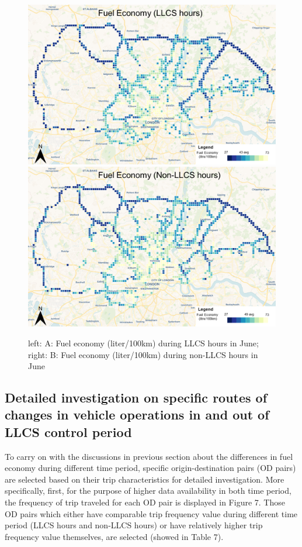 \documentclass[preprint,12pt,3p]{elsarticle}
\begin{document}
\begin{figure}[h]          
    \mbox{\includegraphics[scale=0.78]{llcsfuel.png}}   
    \hspace{0.1px}
    \mbox{\includegraphics[scale=0.78]{nonllcsfuel.png}}
    \caption{left: A: Fuel economy (liter/100km) during LLCS hours in June; right: B: Fuel economy (liter/100km) during non-LLCS hours in June}
    \label{fig6}
\end{figure}





\subsection{Detailed investigation on specific routes of changes in vehicle operations in and out of LLCS control period }

To carry on with the discussions in previous section about the differences in fuel economy during different time period, specific origin-destination pairs (OD pairs) are selected based on their trip characteristics for detailed investigation. More specifically, first, for the purpose of higher data availability in both time period, the frequency of trip traveled for each OD pair is displayed in Figure 7. Those OD pairs which either have comparable trip frequency value during different time period (LLCS hours and non-LLCS hours) or have relatively higher trip frequency value themselves, are selected (showed in Table 7).
\end{document}
